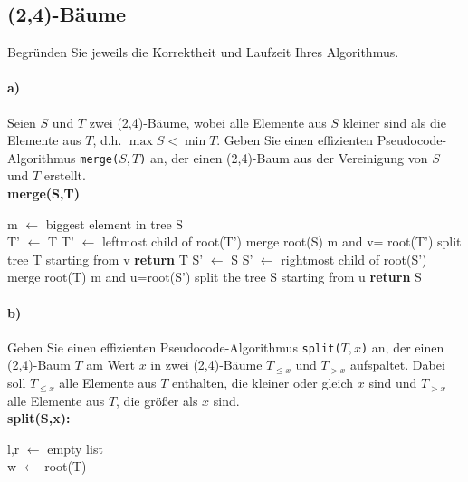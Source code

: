 \documentclass[paper=a4, fontsize=11pt]{scrartcl}
\numberwithin{equation}{section}
\numberwithin{figure}{section}
\numberwithin{table}{section}
\begin{document}
\subsection{(2,4)-Bäume}
Begründen Sie jeweils die Korrektheit und Laufzeit Ihres Algorithmus.

\paragraph{a)} 
Seien $S$ und $T$ zwei (2,4)-Bäume, wobei alle Elemente aus $S$ kleiner sind
als die Elemente aus $T$, d.h. $\max S < \min T$.
Geben Sie einen effizienten Pseudocode-Algorithmus \texttt{merge($S,T$)} an,
der einen (2,4)-Baum aus der Vereinigung von $S$ und $T$ erstellt. \\

\textbf{merge(S,T)} \\
\begin{algorithm}[H]
\SetAlgoLined
m $\leftarrow$ biggest element in tree S \\
 {
   T' $\leftarrow$ T \;
    {
   T' $\leftarrow$ leftmost child of root(T') \;
   }
   merge root(S) \;
   m and v= root(T') \;
   split tree T starting from v \;
   \textbf{return} T \;
} {
   S' $\leftarrow$ S \;
    {
   S' $\leftarrow$ rightmost child of root(S') \;
   }
   merge root(T) \;
   m and u=root(S') \;
   split the tree S starting from u \;
   \textbf{return} S \;
}
\end{algorithm}

\paragraph{b)}
Geben Sie einen effizienten Pseudocode-Algorithmus \texttt{split($T,x$)} an, 
der einen (2,4)-Baum $T$ am Wert $x$ in zwei (2,4)-Bäume $T_{\le x}$ und $T_{> x}$ aufspaltet. 
Dabei soll $T_{\le x}$ alle Elemente aus $T$ enthalten,
die kleiner oder gleich $x$ sind und $T_{> x}$ alle Elemente aus $T$, die größer als $x$ sind. \\

\textbf{split(S,x):} \\
\begin{algorithm}[H]
\SetAlgoLined
l,r $\leftarrow$ empty list \\
w $\leftarrow$ root(T)
\end{algorithm}
\end{document}
